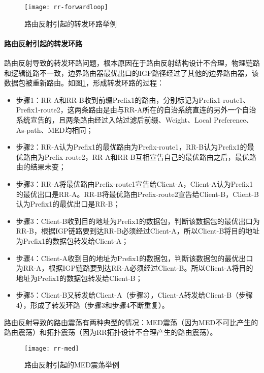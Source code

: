 \begin{figure}
  \centering
  \texttt{[image: rr-forwardloop]}
  \caption{路由反射引起的转发环路举例\cite{Dube1999A}}
  \label{fig:rr-forwardloop}
\end{figure}


\paragraph{路由反射引起的转发环路}
路由反射导致的转发环路\cite{Dube1999A}问题，根本原因在于路由反射结构设计不合理，物理链路和逻辑链路不一致，边界路由器最优出口的IGP路径经过了其他的边界路由器，该数据包被重新路由。如图\ref{fig:rr-forwardloop}，形成转发环路的过程：

\begin{itemize}
\item 步骤1：RR-A和RR-B收到前缀Prefix1的路由，分别标记为Prefix1-route1、Prefix1-route2，这两条路由是由与RR-A所在的自治系统直连的另外一个自治系统宣告的，且两条路由经过入站过滤后前缀、Weight、Local Preference、As-path、MED均相同；
\item 步骤2：RR-A认为Prefix1的最优路由为Prefix-route1，RR-B认为Prefix1的最优路由为Prefix-route2，RR-A和RR-B互相宣告自己的最优路由之后，最优路由的结果未变；
\item 步骤3：RR-A将最优路由Prefix-route1宣告给Client-A，Client-A认为Prefix1的最优出口是RR-A。RR-B将最优路由Prefix-route2宣告给Client-B，Client-B认为Prefix1的最优出口是RR-B；
\item 步骤3：Client-B收到目的地址为Prefix1的数据包，判断该数据包的最优出口为RR-B，根据IGP链路要到达RR-B必须经过Client-A，所以Client-B将目的地址为Prefix1的数据包转发给Client-A；
\item 步骤4：Client-A收到目的地址为Prefix1的数据包，判断该数据包的最优出口为RR-A，根据IGP链路要到达RR-A必须经过Client-B。所以Client-A将目的地址为Prefix1的数据包转发给Client-B；
\item 步骤5：Client-B又转发给Client-A（步骤3），Client-A转发给Client-B（步骤4），形成了转发环路（步骤3和步骤4不断重复）。\\
\end{itemize}



路由反射导致的路由震荡有两种典型的情况：MED震荡（因为MED不可比产生的路由震荡）和拓扑震荡（因为RR拓扑设计不合理产生的路由震荡）。


\begin{figure}
  \centering
  \texttt{[image: rr-med]}
  \caption{路由反射引起的MED震荡举例\cite{Flavel2009Stable}}
  \label{fig:rr-med}
\end{figure}

